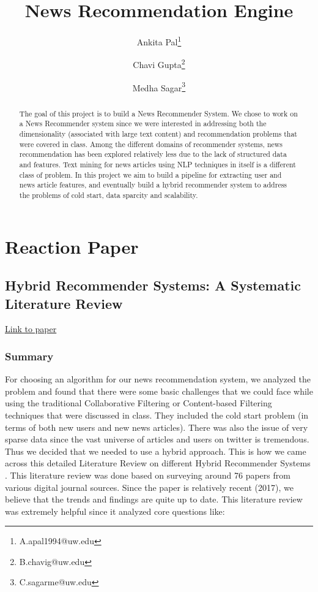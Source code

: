 \documentclass{article}
\title{News Recommendation Engine}
\author[1]{Ankita Pal\thanks{A.apal1994@uw.edu}}
\author[1]{Chavi Gupta\thanks{B.chavig@uw.edu}}
\author[1]{Medha Sagar\thanks{C.sagarme@uw.edu}}
\affil[1]{Department of Data Science, University of Washington}
\begin{document}
\maketitle

\begin{abstract}
    The goal of this project is to build a News Recommender System. We chose to work on a News Recommender system since we were interested in addressing both the dimensionality (associated with large text content) and recommendation problems that were covered in class. Among the different domains of recommender systems, news recommendation has been explored relatively less due to the lack of structured data and features. Text mining for news articles using NLP techniques in itself is a different class of problem. In this project we aim to build a pipeline for extracting user and news article features, and eventually build a hybrid recommender system to address the problems of cold start, data sparcity and scalability. 
\end{abstract}

\section{Reaction Paper}

\subsection{Hybrid Recommender Systems: A Systematic Literature Review}
\href{https://arxiv.org/pdf/1901.03888.pdf}{Link to paper}

\subsubsection{Summary}
For choosing an algorithm for our news recommendation system, we analyzed the problem and found that there were some basic challenges that we could face while using the traditional Collaborative Filtering or Content-based Filtering techniques that were discussed in class. They included the cold start problem (in terms of both new users and new news articles). There was also the issue of very sparse data since the vast universe of articles and users on twitter is tremendous. Thus we decided that we needed to use a hybrid approach.
This is how we came across this detailed Literature Review on different Hybrid Recommender Systems \cite{litReview}. This literature review was done based on surveying around 76 papers from various digital journal sources. Since the paper is relatively recent (2017), we believe that the trends and findings are quite up to date. This literature review was extremely helpful since it analyzed core questions like:
\end{document}
